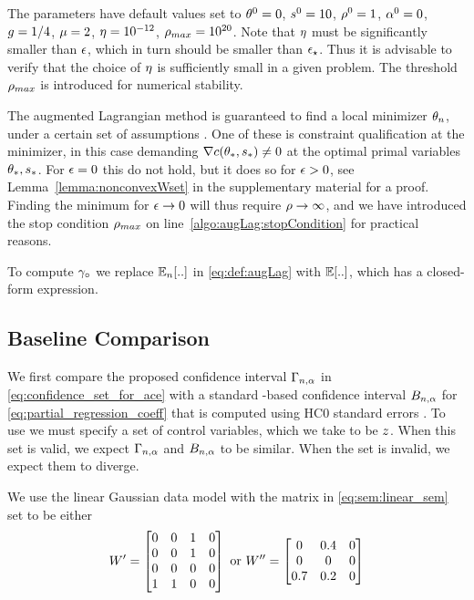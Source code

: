 The parameters have default values set to $\theta^0=0$, $s^0=10$, $\rho^0=1$, $\alpha^0=0$, $g=1/4$, $\mu=2$, $\eta=10^{-12}$, $\rho_{max} = 10^{20}$. Note that $\eta$ must be significantly smaller than $\epsilon$, which in turn should be smaller than $\epsilon_\star$. Thus it is advisable to verify that the choice of $\eta$ is sufficiently small in a given problem. The threshold $\rho_{max}$ is introduced for numerical stability.

The augmented Lagrangian method is guaranteed to find a local minimizer $\theta_n$, under a certain set of assumptions \citep[Theorem 17.6]{nocedal_numerical_2006}. One of these is constraint qualification at the minimizer, in this case demanding $\nabla c(\theta_*,s_*) \neq 0$ at the optimal primal variables $\theta_*,s_*$. For $\epsilon=0$ this do not hold, but it does so for $\epsilon > 0$, see Lemma~\ref{lemma:nonconvexWset} in the supplementary material for a proof. Finding the minimum for $\epsilon \to 0$ will thus require $\rho \to \infty$, and we have introduced the stop condition $\rho_{max}$ on line~\ref{algo:augLag:stopCondition} for practical reasons.

To compute $\gamma_\circ$ we replace $\mathbb{E}_n[..]$ in \eqref{eq:def:augLag} with $\mathbb{E}[..]$, which has a closed-form expression.


\subsection{Baseline Comparison}
\label{subsection:correctly_identify_adjustment}
\label{subsection:same_as_ols}

We first compare the proposed confidence interval $\Gamma_{n,\alpha}$ in \eqref{eq:confidence_set_for_ace} with a standard \OLS-based confidence interval $B_{n,\alpha}$ for \eqref{eq:partial_regression_coeff} that is computed using HC0 standard errors \citep{wooldridge_econometric_2010}. To use \OLS{} we must specify a set of control variables, which we take to be $z$. When this set is valid, we expect $\Gamma_{n,\alpha}$ and $B_{n,\alpha}$ to be similar. When the set is invalid, we expect them to diverge.

We use the linear Gaussian data model with the matrix in \eqref{eq:sem:linear_sem} set to be either
\[W '=\begin{bmatrix}
          0 & 0 & 1 & 0 \\
          0 & 0 & 1 & 0 \\
          0 & 0 & 0 & 0 \\
          1 & 1 & 0 & 0 \\
     \end{bmatrix} \text{ or } W '' = \begin{bmatrix} 0& 0.4& 0\\ 0& 0& 0 \\ 0.7 & 0.2& 0 \end{bmatrix} \]

